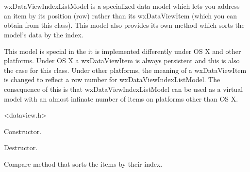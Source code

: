 
\section{}\label{wxdataviewindexlistmodel}

wxDataViewIndexListModel is a specialized data model which lets
you address an item by its position (row) rather than its 
wxDataViewItem (which you can obtain from this class). 
This model also provides its own 
 method
which sorts the model's data by the index.

This model is special in the it is implemented differently under OS X
and other platforms. Under OS X a wxDataViewItem is always persistent
and this is also the case for this class. Under other platforms, the
meaning of a wxDataViewItem is changed to reflect a row number for
wxDataViewIndexListModel. The consequence of this is that 
wxDataViewIndexListModel can be used as a virtual model with an
almost infinate number of items on platforms other than OS X.




<dataview.h>



\label{wxdataviewindexlistmodelwxdataviewindexlistmodel}


Constructor.

\label{wxdataviewindexlistmodeldtor}


Destructor.

\label{wxdataviewindexlistmodelcompare}


Compare method that sorts the items by their index.

\label{wxdataviewindexlistmodelgetattr}

